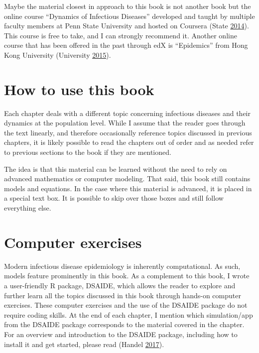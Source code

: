 \documentclass[]{book}
\theoremstyle{definition}
\theoremstyle{definition}
\theoremstyle{definition}
\theoremstyle{remark}
\begin{document}
Maybe the material closest in approach to this book is not another book
but the online course ``Dynamics of Infectious Diseases'' developed and
taught by multiple faculty members at Penn State University and hosted
on Coursera (State \protect\hyperlink{ref-epimooc}{2014}). This course
is free to take, and I can strongly recommend it. Another online course
that has been offered in the past through edX is ``Epidemics'' from Hong
Kong University (University \protect\hyperlink{ref-hkepidemics}{2015}).

\section{How to use this book}\label{how-to-use-this-book}

Each chapter deals with a different topic concerning infectious diseases
and their dynamics at the population level. While I assume that the
reader goes through the text linearly, and therefore occasionally
reference topics discussed in previous chapters, it is likely possible
to read the chapters out of order and as needed refer to previous
sections to the book if they are mentioned.

The idea is that this material can be learned without the need to rely
on advanced mathematics or computer modeling. That said, this book still
contains models and equations. In the case where this material is
advanced, it is placed in a special text box. It is possible to skip
over those boxes and still follow everything else.

\section{Computer exercises}\label{computer-exercises}

Modern infectious disease epidemiology is inherently computational. As
such, models feature prominently in this book. As a complement to this
book, I wrote a user-friendly R package, DSAIDE, which allows the reader
to explore and further learn all the topics discussed in this book
through hands-on computer exercises. These computer exercises and the
use of the DSAIDE package do not require coding skills. At the end of
each chapter, I mention which simulation/app from the DSAIDE package
corresponds to the material covered in the chapter. For an overview and
introduction to the DSAIDE package, including how to install it and get
started, please read (Handel \protect\hyperlink{ref-handel17}{2017}).
\end{document}
